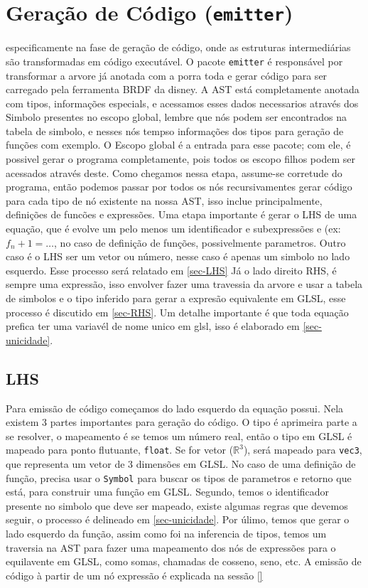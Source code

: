 
\section{Geração de Código (\texttt{emitter})} \label{section-emitter}

especificamente na fase de geração de código, onde as estruturas intermediárias são transformadas em código executável.
O pacote \texttt{emitter} é responsável por transformar a arvore já anotada com a porra toda e gerar código para ser carregado pela ferramenta BRDF da disney.
A AST está completamente anotada com tipos, informações especials, e acessamos esses dados necessarios através dos Simbolo presentes no escopo global, lembre que nós podem ser encontrados na tabela de simbolo, e nesses nós tempso informações dos tipos para geração de funções com exemplo. O Escopo global é a entrada para esse pacote; com ele, é possivel gerar o programa completamente, pois todos os escopo filhos podem ser acessados através deste.
Como chegamos nessa etapa, assume-se corretude do programa, então podemos passar por todos os nós recursivamentes gerar código para cada tipo de nó existente na nossa AST, isso inclue principalmente, definições de funcões e expressões. Uma etapa importante é gerar o LHS de uma equação, que é evolve um pelo menos um identificador e subexpressões e (ex: $f_n+1 = \dots$, no caso de definição de funções, possivelmente parametros. Outro caso é o LHS ser um vetor ou número, nesse caso é apenas  um simbolo no lado esquerdo. 
Esse processo será relatado em \autoref{sec-LHS} Já o lado direito RHS, é sempre uma expressão, isso envolver fazer uma travessia da arvore e usar a tabela de simbolos e o tipo inferido para gerar a expresão equivalente em GLSL, esse processo é discutido em \autoref{sec-RHS}. Um detalhe importante é que toda equação prefica ter uma variavél de nome unico em glsl, isso é elaborado em \autoref{sec-unicidade}.


\subsection{LHS}
Para emissão de código começamos do lado esquerdo da equação possui. Nela existem 3 partes importantes para geração do código. O tipo é aprimeira parte a se resolver, o mapeamento é se temos um número real, então o tipo em GLSL é mapeado para ponto flutuante, \verb`float`. Se for vetor ($\mathbb{R}^3$), será mapeado para \verb`vec3`, que representa um vetor de 3 dimensões em GLSL. No caso de uma definição de função, precisa usar o \verb`Symbol` para buscar os tipos de parametros e retorno que está, para construir uma função em GLSL. Segundo, temos o identificador presente no simbolo que deve ser mapeado, existe algumas regras que devemos seguir, o processo é delineado em \autoref{sec-unicidade}. Por úlimo, temos que gerar o lado esquerdo da função, assim como foi na inferencia de tipos, temos um traversia na AST para fazer uma mapeamento dos nós de expressões para o equilavente em GLSL, como somas, chamadas de cosseno, seno, etc. A emissão de código à partir de um nó expressão é explicada na sessão \autoref{}

